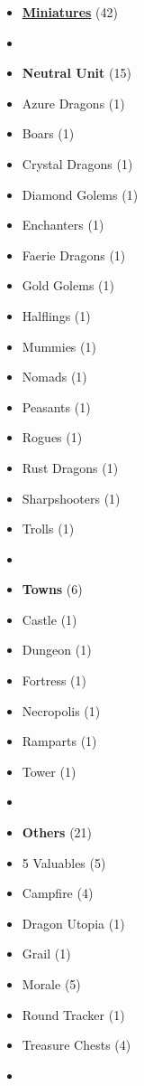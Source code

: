 
\begin{multicols*}{2}

\footnotesize

\begin{itemize}[leftmargin=0pt, label={}, noitemsep]
  \item \textbf{\small{\underline{Miniatures}}} (42)
  \item
  \item \textbf{Neutral Unit} (15)
  \item Azure Dragons (1)
  \item Boars (1)
  \item Crystal Dragons (1)
  \item Diamond Golems (1)
  \item Enchanters (1)
  \item Faerie Dragons (1)
  \item Gold Golems (1)
  \item Halflings (1)
  \item Mummies (1)
  \item Nomads (1)
  \item Peasants (1)
  \item Rogues (1)
  \item Rust Dragons (1)
  \item Sharpshooters (1)
  \item Trolls (1)
  \item
  \item \textbf{Towns} (6)
  \item Castle (1)
  \item Dungeon (1)
  \item Fortress (1)
  \item Necropolis (1)
  \item Ramparts (1)
  \item Tower (1)
  \item
  \item \textbf{Others} (21)
  \item 5 Valuables (5)
  \item Campfire (4)
  \item Dragon Utopia (1)
  \item Grail (1)
  \item Morale (5)
  \item Round Tracker (1)
  \item Treasure Chests (4)
  \item

\end{itemize}
\end{multicols*}
